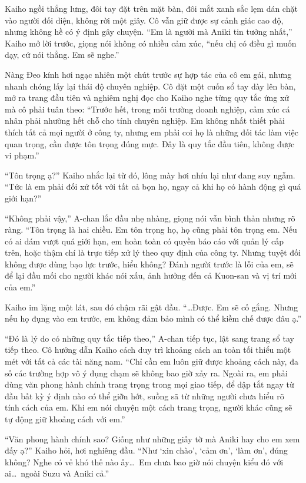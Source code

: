 \documentclass[../main.tex]{subfiles}
\begin{document}
Kaiho ngồi thẳng lưng, đôi tay đặt trên mặt bàn, đôi mắt xanh sắc lẹm dán chặt vào người đối diện, không rời một giây. Cô vẫn giữ được sự cảnh giác cao độ, nhưng không hề có ý định gây chuyện. ``Em là người mà Aniki tin tưởng nhất,'' Kaiho mở lời trước, giọng nói không có nhiều cảm xúc, ``nếu chị có điều gì muốn dạy, cứ nói thẳng. Em sẽ nghe.''

Nàng Đeo kính hơi ngạc nhiên một chút trước sự hợp tác của cô em gái, nhưng nhanh chóng lấy lại thái độ chuyên nghiệp. Cô đặt một cuốn sổ tay dày lên bàn, mở ra trang đầu tiên và nghiêm nghị đọc cho Kaiho nghe từng quy tắc ứng xử mà cô phải tuân theo: ``Trước hết, trong môi trường doanh nghiệp, cảm xúc cá nhân phải nhường hết chỗ cho tính chuyên nghiệp. Em không nhất thiết phải thích tất cả mọi người ở công ty, nhưng em phải coi họ là những đối tác làm việc quan trọng, cần được tôn trọng đúng mực. Đây là quy tắc đầu tiên, không được vi phạm.''

``Tôn trọng ạ?'' Kaiho nhắc lại từ đó, lông mày hơi nhíu lại như đang suy ngẫm. ``Tức là em phải đối xử tốt với tất cả bọn họ, ngay cả khi họ có hành động gì quá giới hạn?''

``Không phải vậy,'' A-chan lắc đầu nhẹ nhàng, giọng nói vẫn bình thản nhưng rõ ràng. ``Tôn trọng là hai chiều. Em tôn trọng họ, họ cũng phải tôn trọng em. Nếu có ai dám vượt quá giới hạn, em hoàn toàn có quyền báo cáo với quản lý cấp trên, hoặc thậm chí là trực tiếp xử lý theo quy định của công ty. Nhưng tuyệt đối không được dùng bạo lực trước, hiểu không? Đánh người trước là lỗi của em, sẽ để lại đầu mối cho người khác nói xấu, ảnh hưởng đến cả Kuon-san và vị trí mới của em.''

Kaiho im lặng một lát, sau đó chậm rãi gật đầu. ``\dots Được. Em sẽ cố gắng. Nhưng nếu họ đụng vào em trước, em không đảm bảo mình có thể kiềm chế được đâu ạ.''

``Đó là lý do có những quy tắc tiếp theo,'' A-chan tiếp tục, lật sang trang sổ tay tiếp theo. Cô hướng dẫn Kaiho cách duy trì khoảng cách an toàn tối thiểu một mét với tất cả các tài năng nam. ``Chỉ cần em luôn giữ được khoảng cách này, đa số các trường hợp vô ý đụng chạm sẽ không bao giờ xảy ra. Ngoài ra, em phải dùng văn phong hành chính trang trọng trong mọi giao tiếp, để dập tắt ngay từ đầu bất kỳ ý định nào có thể giỡn hớt, suồng sã từ những người chưa hiểu rõ tính cách của em. Khi em nói chuyện một cách trang trọng, người khác cũng sẽ tự động giữ khoảng cách với em.''

``Văn phong hành chính sao? Giống như những giấy tờ mà Aniki hay cho em xem đấy ạ?'' Kaiho hỏi, hơi nghiêng đầu. ``Như `xin chào', `cảm ơn', `làm ơn', đúng không? Nghe có vẻ khó thế nào ấy\dots\ Em chưa bao giờ nói chuyện kiểu đó với ai\dots\ ngoài Suzu và Aniki cả.''
\end{document}
